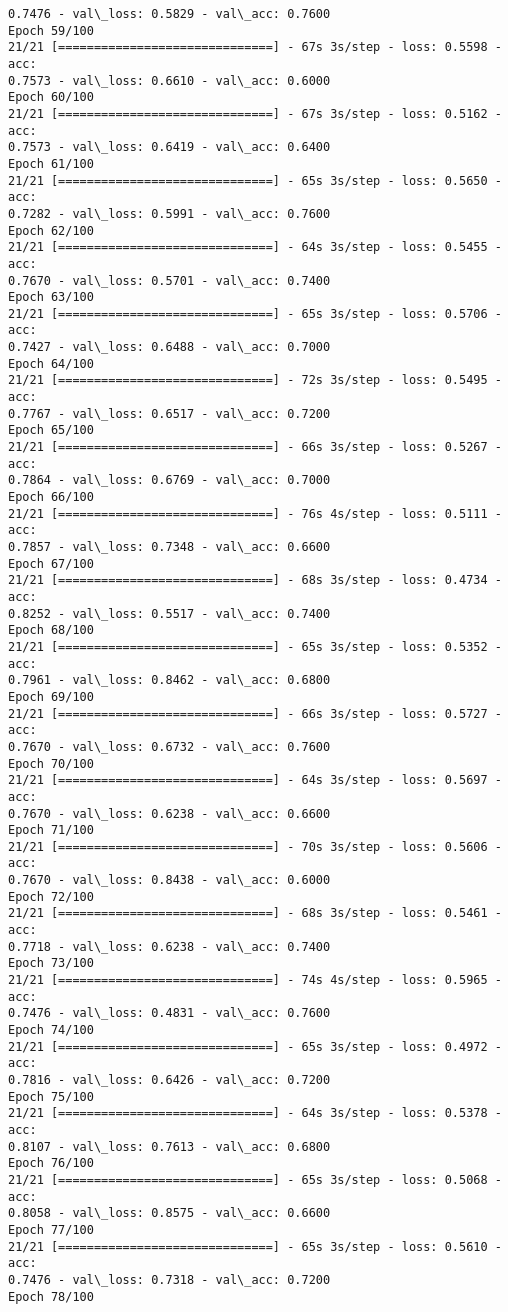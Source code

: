 \documentclass[11pt]{article}
\begin{document}
\begin{Verbatim}[commandchars=\\\{\}]
0.7476 - val\_loss: 0.5829 - val\_acc: 0.7600
Epoch 59/100
21/21 [==============================] - 67s 3s/step - loss: 0.5598 - acc:
0.7573 - val\_loss: 0.6610 - val\_acc: 0.6000
Epoch 60/100
21/21 [==============================] - 67s 3s/step - loss: 0.5162 - acc:
0.7573 - val\_loss: 0.6419 - val\_acc: 0.6400
Epoch 61/100
21/21 [==============================] - 65s 3s/step - loss: 0.5650 - acc:
0.7282 - val\_loss: 0.5991 - val\_acc: 0.7600
Epoch 62/100
21/21 [==============================] - 64s 3s/step - loss: 0.5455 - acc:
0.7670 - val\_loss: 0.5701 - val\_acc: 0.7400
Epoch 63/100
21/21 [==============================] - 65s 3s/step - loss: 0.5706 - acc:
0.7427 - val\_loss: 0.6488 - val\_acc: 0.7000
Epoch 64/100
21/21 [==============================] - 72s 3s/step - loss: 0.5495 - acc:
0.7767 - val\_loss: 0.6517 - val\_acc: 0.7200
Epoch 65/100
21/21 [==============================] - 66s 3s/step - loss: 0.5267 - acc:
0.7864 - val\_loss: 0.6769 - val\_acc: 0.7000
Epoch 66/100
21/21 [==============================] - 76s 4s/step - loss: 0.5111 - acc:
0.7857 - val\_loss: 0.7348 - val\_acc: 0.6600
Epoch 67/100
21/21 [==============================] - 68s 3s/step - loss: 0.4734 - acc:
0.8252 - val\_loss: 0.5517 - val\_acc: 0.7400
Epoch 68/100
21/21 [==============================] - 65s 3s/step - loss: 0.5352 - acc:
0.7961 - val\_loss: 0.8462 - val\_acc: 0.6800
Epoch 69/100
21/21 [==============================] - 66s 3s/step - loss: 0.5727 - acc:
0.7670 - val\_loss: 0.6732 - val\_acc: 0.7600
Epoch 70/100
21/21 [==============================] - 64s 3s/step - loss: 0.5697 - acc:
0.7670 - val\_loss: 0.6238 - val\_acc: 0.6600
Epoch 71/100
21/21 [==============================] - 70s 3s/step - loss: 0.5606 - acc:
0.7670 - val\_loss: 0.8438 - val\_acc: 0.6000
Epoch 72/100
21/21 [==============================] - 68s 3s/step - loss: 0.5461 - acc:
0.7718 - val\_loss: 0.6238 - val\_acc: 0.7400
Epoch 73/100
21/21 [==============================] - 74s 4s/step - loss: 0.5965 - acc:
0.7476 - val\_loss: 0.4831 - val\_acc: 0.7600
Epoch 74/100
21/21 [==============================] - 65s 3s/step - loss: 0.4972 - acc:
0.7816 - val\_loss: 0.6426 - val\_acc: 0.7200
Epoch 75/100
21/21 [==============================] - 64s 3s/step - loss: 0.5378 - acc:
0.8107 - val\_loss: 0.7613 - val\_acc: 0.6800
Epoch 76/100
21/21 [==============================] - 65s 3s/step - loss: 0.5068 - acc:
0.8058 - val\_loss: 0.8575 - val\_acc: 0.6600
Epoch 77/100
21/21 [==============================] - 65s 3s/step - loss: 0.5610 - acc:
0.7476 - val\_loss: 0.7318 - val\_acc: 0.7200
Epoch 78/100

\end{Verbatim}
\end{document}
